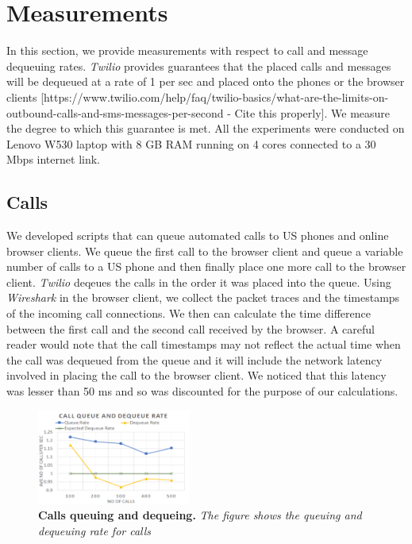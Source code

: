 \section{Measurements}
\label{sec-measurements}

In this section, we provide measurements with respect to call and message dequeuing rates. \textit{Twilio} provides guarantees that the placed calls and messages will be dequeued at a rate of 1 per sec and placed onto the phones or the browser clients [https://www.twilio.com/help/faq/twilio-basics/what-are-the-limits-on-outbound-calls-and-sms-messages-per-second - Cite this properly]. We measure the degree to which this guarantee is met. All the experiments were conducted on Lenovo W530 laptop with 8 GB RAM running on 4 cores connected to a 30 Mbps internet link.

\subsection{Calls}
\label{sec-measurements-calls}
We developed scripts that can queue automated calls to US phones and online browser clients. We queue the first call to the browser client and queue a variable number of calls to a US phone and then finally place one more call to the browser client. \textit{Twilio} deqeues the calls in the order it was placed into the queue. Using \textit{Wireshark} in the browser client, we collect the packet traces and the timestamps of the incoming call connections. We then can calculate the time difference between the first call and the second call received by the browser. A careful reader would note that the call timestamps may not reflect the actual time when the call was dequeued from the queue and it will include the network latency involved in placing the call to the browser client. We noticed that this latency was lesser than 50 ms and so was discounted for the purpose of our calculations. 

\begin{figure} \centering
\includegraphics[width=0.45\textwidth]{graphs/calls.pdf}
\caption{\textbf{Calls queuing and dequeing.} {\footnotesize\textit{
The figure shows the queuing and dequeuing rate for calls
}}}
\label{fig:calls}
\end{figure}

